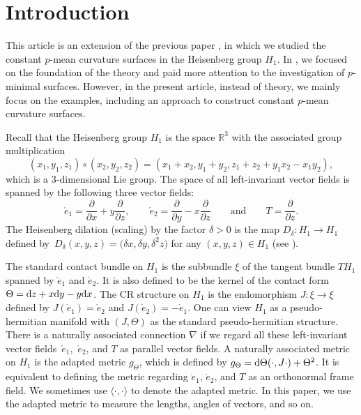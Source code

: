 \documentclass[pdftex]{sigma}
\numberwithin{equation}{section}
\begin{document}


\section{Introduction}
This article is an extension of the previous paper \cite{ChiuH/LiuH:2022}, in which we studied the constant $p$-mean curvature surfaces in the Heisenberg group $H_{1}$. In \cite{ChiuH/LiuH:2022}, we focused on the foundation of the theory and paid more attention to the investigation of $p$-minimal surfaces. However, in the present article, instead of theory, we mainly focus on the examples, including an approach to construct constant $p$-mean curvature surfaces.

Recall that the Heisenberg group $H_1$ is the space $\mathbb{R}^3$ with the associated group multiplication%
\[(x_1,y_1,z_1)\circ (x_2,y_2,z_2)
=(x_1+x_2,y_1+y_2, z_1+z_2+y_1x_2-x_1y_2),\]
which is a $3$-dimensional Lie group. The space of all
left-invariant vector fields is spanned by the following three vector fields:
\[\mathring{e}_1=\frac{\partial}{\partial x}+y\frac{\partial}{\partial z},\qquad
\mathring{e}_2=\frac{\partial}{\partial y}-x\frac{\partial}{\partial z}
\qquad\text{and}\qquad T=\frac{\partial}{\partial z}.\]
The Heisenberg dilation (scaling) by the factor $\delta>0$ is the map $D_\delta\colon H_1\rightarrow H_1$ defined by~${D_\delta(x,y,z)=\bigl(\delta x,\delta y,\delta^2 z\bigr)}$ for any $(x,y,z)\in H_1$ (see \cite{Dragomir/Tomassini:2006}).

The standard contact bundle on $H_1$ is the subbundle $\xi$ of the tangent bundle
$TH_1$ spanned by $\mathring{e}_1$ and $\mathring{e}_2$. It is also defined to be the kernel of
the contact form
$\Theta={\rm d}z+x{\rm d}y-y{\rm d}x$.
The CR structure on $H_1$ is the endomorphism $J\colon \xi\to \xi$ defined by
$J(\mathring{e}_1)=\mathring{e}_2$ and $J(\mathring{e}_2)=-\mathring{e}_1$.
One can view $H_1$ as a pseudo-hermitian manifold
with $(J,\Theta)$ as the standard pseudo-hermitian structure. There is a naturally associated connection $\nabla$ if we regard all these left-invariant vector fields~$\mathring{e}_1$,~$\mathring{e}_2$, and $T$ as parallel vector fields.
A naturally associated metric on $H_{1}$ is the adapted metric $g_{\Theta}$, which is defined by $g_{\Theta}={\rm d}\Theta(\cdot,J\cdot)+\Theta^{2}$. It is equivalent to defining the metric regarding $\mathring{e}_1$, $\mathring{e}_2$, and $T$ as an orthonormal frame field. We sometimes use $\langle \cdot,\cdot\rangle$ to denote the adapted metric. In this paper, we use the adapted metric to measure the lengths, angles of vectors, and so on.
\end{document}
